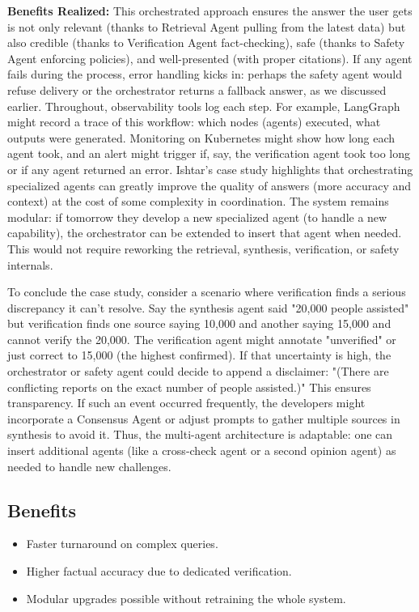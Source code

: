 \textbf{Benefits Realized:} This orchestrated approach ensures the answer the user gets is not only relevant (thanks to Retrieval Agent pulling from the latest data) but also credible (thanks to Verification Agent fact-checking), safe (thanks to Safety Agent enforcing policies), and well-presented (with proper citations). If any agent fails during the process, error handling kicks in: perhaps the safety agent would refuse delivery or the orchestrator returns a fallback answer, as we discussed earlier. Throughout, observability tools log each step. For example, LangGraph \cite{langchain} might record a trace of this workflow: which nodes (agents) executed, what outputs were generated. Monitoring on Kubernetes might show how long each agent took, and an alert might trigger if, say, the verification agent took too long or if any agent returned an error. Ishtar's case study highlights that orchestrating specialized agents can greatly improve the quality of answers (more accuracy and context) at the cost of some complexity in coordination. The system remains modular: if tomorrow they develop a new specialized agent (to handle a new capability), the orchestrator can be extended to insert that agent when needed. This would not require reworking the retrieval, synthesis, verification, or safety internals.

To conclude the case study, consider a scenario where verification finds a serious discrepancy it can't resolve. Say the synthesis agent said "20{,}000 people assisted" but verification finds one source saying 10{,}000 and another saying 15{,}000 and cannot verify the 20{,}000. The verification agent might annotate "unverified" or just correct to 15{,}000 (the highest confirmed). If that uncertainty is high, the orchestrator or safety agent could decide to append a disclaimer: "(There are conflicting reports on the exact number of people assisted.)" This ensures transparency. If such an event occurred frequently, the developers might incorporate a Consensus Agent or adjust prompts to gather multiple sources in synthesis to avoid it. Thus, the multi-agent architecture is adaptable: one can insert additional agents (like a cross-check agent or a second opinion agent) as needed to handle new challenges.

\subsection{Benefits}
\begin{itemize}
    \item Faster turnaround on complex queries.
    \item Higher factual accuracy due to dedicated verification.
    \item Modular upgrades possible without retraining the whole system.
\end{itemize}

